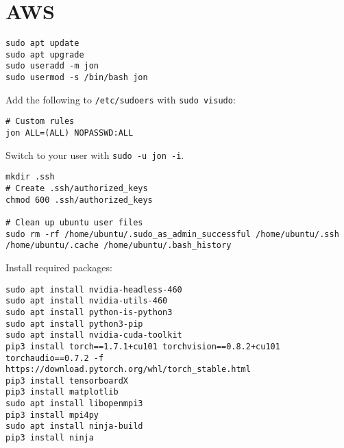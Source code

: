 \chapter{AWS}
\label{chap:aws}

\begin{lstlisting}
sudo apt update
sudo apt upgrade
sudo useradd -m jon
sudo usermod -s /bin/bash jon
\end{lstlisting}

Add the following to \texttt{/etc/sudoers} with \texttt{sudo visudo}:

\begin{lstlisting}
# Custom rules
jon ALL=(ALL) NOPASSWD:ALL
\end{lstlisting}

Switch to your user with \texttt{sudo -u jon -i}.

\begin{lstlisting}
mkdir .ssh
# Create .ssh/authorized_keys
chmod 600 .ssh/authorized_keys

# Clean up ubuntu user files
sudo rm -rf /home/ubuntu/.sudo_as_admin_successful /home/ubuntu/.ssh /home/ubuntu/.cache /home/ubuntu/.bash_history
\end{lstlisting}

Install required packages:

\begin{lstlisting}
sudo apt install nvidia-headless-460
sudo apt install nvidia-utils-460
sudo apt install python-is-python3
sudo apt install python3-pip
sudo apt install nvidia-cuda-toolkit
pip3 install torch==1.7.1+cu101 torchvision==0.8.2+cu101 torchaudio==0.7.2 -f https://download.pytorch.org/whl/torch_stable.html
pip3 install tensorboardX
pip3 install matplotlib
sudo apt install libopenmpi3
pip3 install mpi4py
sudo apt install ninja-build
pip3 install ninja
\end{lstlisting}
